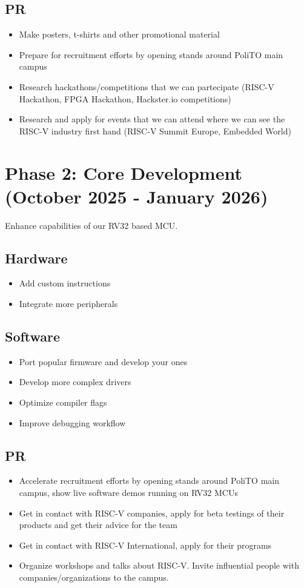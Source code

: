 \documentclass{article}
\begin{document}
\subsection{PR}
\begin{itemize}
    \item Make posters, t-shirts and other promotional material
    \item Prepare for recruitment efforts by opening stands around PoliTO main campus
    \item Research hackathons/competitions that we can partecipate (RISC-V Hackathon, FPGA Hackathon, Hackster.io competitions)
    \item Research and apply for events that we can attend where we can see the RISC-V industry first hand (RISC-V Summit Europe, Embedded World)
    
\end{itemize}

\section{Phase 2: Core Development (October 2025 - January 2026)}
Enhance capabilities of our RV32 based MCU.

\subsection{Hardware}
\begin{itemize}
    \item Add custom instructions
    \item Integrate more peripherals
\end{itemize}

\subsection{Software}
\begin{itemize}
    \item Port popular firmware and develop your ones
    \item Develop more complex drivers
    \item Optimize compiler flags
    \item Improve debugging workflow
\end{itemize}

\subsection{PR}
\begin{itemize}
    \item Accelerate recruitment efforts by opening stands around PoliTO main campus, show live software demos running on RV32 MCUs
    \item Get in contact with RISC-V companies, apply for beta testings of their products and get their advice for the team
    \item Get in contact with RISC-V International, apply for their programs
    \item Organize workshops and talks about RISC-V. Invite influential people with companies/organizations to the campus.
\end{itemize}
\end{document}
